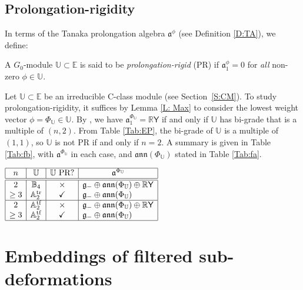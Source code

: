 \documentclass[10pt,a4paper]{amsart}
\DeclareMathOperator{\tf}{tf}
\DeclareMathOperator{\tr}{tr}
\newcommand{\g}{\mathfrak{g}}
\newcommand\fa{\mathfrak{a}}
\newcommand\fann{\mathfrak{ann}}
\newcommand{\R}{\mathbb{R}}
\newcommand\bbE{\mathbb{E}}
\newcommand\bbU{\mathbb{U}}
\newcommand\bbA{\mathbb{A}}
\newcommand\bbB{\mathbb{B}}
\newcommand\sfY{\mathsf{Y}}
\numberwithin{equation}{section}
\begin{document}
\subsection{Prolongation-rigidity}\label{S:PR}
In terms of the Tanaka prolongation algebra $\fa^\phi$ (see Definition \ref{D:TA}), we define:
\begin{Definition}\label{D:PR}
A $G_0$-module $\bbU \subset \bbE$ is said to be {\em prolongation-rigid} (PR) if $\fa_1^\phi = 0$ for {\em all} non-zero $\phi \in \bbU$.
\end{Definition}

Let $\bbU \subset \bbE$ be an irreducible C-class module (see Section~\ref{S:CM}). To study prolongation-rigidity, it suffices by Lemma \ref{L: Max} to consider the lowest weight vector $\phi = \Phi_\bbU \in \bbU$. By \cite[Lemma~3.3]{KT2021}, we have $\fa^{\Phi_\bbU}_1 = \R \sfY$ if and only if $\bbU$ has bi-grade that is a multiple of $(n,2)$. From Table \ref{Tab:EP}, the bi-grade of $\bbU$ is a multiple of $(1,1)$, so $\bbU$ is not PR if and only if $n=2$. A summary is given in Table \ref{Tab:fb}, with $\fa^{\Phi_\bbU}$ in each case, and $\fann(\Phi_\bbU)$ stated in Table \ref{Tab:fa}.

\begin{table}[ht!]\renewcommand{\arraystretch}{1.15}
\centering
$\begin{array}{|c|c|c|l|} \hline
n & \bbU & \bbU \text{ PR?} & \multicolumn{1}{c|}{\fa^{\Phi_\bbU}}\\ \hline\hline
2 & \bbB_4 &\times & \g_{-} \oplus \fann (\Phi_\bbU) \oplus \R\sfY\\
\ge 3 & \bbA_2^{\tr}&\checkmark & \g_{-} \oplus \fann (\Phi_\bbU) \\ \hline
2 & \bbA_2^{\tf} & \times & \g_{-} \oplus \fann (\Phi_\bbU) \oplus \R\sfY \\
\ge 3&\bbA_2^{\tf} &\checkmark & \g_{-} \oplus \fann (\Phi_\bbU) \\ \hline
\end{array}$
\caption{Prolongation-rigidity for irreducible C-class modules $\bbU \subset \bbE$.}\label{Tab:fb}
\vspace{-1mm}
\end{table}

\section{Embeddings of filtered sub-deformations} \label{S:Embed}
\end{document}
